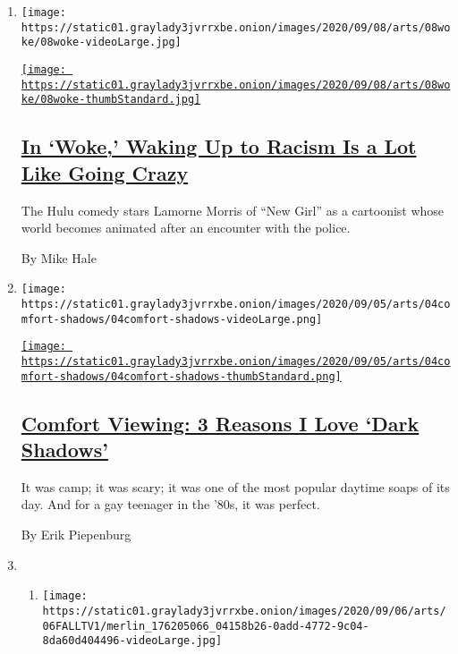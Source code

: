 \begin{enumerate}
\def\labelenumi{\arabic{enumi}.}
\item
  \texttt{[image: https://static01.graylady3jvrrxbe.onion/images/2020/09/08/arts/08woke/08woke-videoLarge.jpg]}

  \href{/2020/09/08/arts/television/review-woke.html}{\texttt{[image: https://static01.graylady3jvrrxbe.onion/images/2020/09/08/arts/08woke/08woke-thumbStandard.jpg]}}

  \hypertarget{in-woke-waking-up-to-racism-is-a-lot-like-going-crazy}{%
  \subsection{\texorpdfstring{\href{/2020/09/08/arts/television/review-woke.html}{In
  `Woke,' Waking Up to Racism Is a Lot Like Going
  Crazy}}{In `Woke,' Waking Up to Racism Is a Lot Like Going Crazy}}\label{in-woke-waking-up-to-racism-is-a-lot-like-going-crazy}}

  The Hulu comedy stars Lamorne Morris of ``New Girl'' as a cartoonist
  whose world becomes animated after an encounter with the police.

  By Mike Hale
\item
  \texttt{[image: https://static01.graylady3jvrrxbe.onion/images/2020/09/05/arts/04comfort-shadows/04comfort-shadows-videoLarge.png]}

  \href{/2020/09/04/arts/television/dark-shadows-stream.html}{\texttt{[image: https://static01.graylady3jvrrxbe.onion/images/2020/09/05/arts/04comfort-shadows/04comfort-shadows-thumbStandard.png]}}

  \hypertarget{comfort-viewing-3-reasons-i-love-dark-shadows}{%
  \subsection{\texorpdfstring{\href{/2020/09/04/arts/television/dark-shadows-stream.html}{Comfort
  Viewing: 3 Reasons I Love `Dark
  Shadows'}}{Comfort Viewing: 3 Reasons I Love `Dark Shadows'}}\label{comfort-viewing-3-reasons-i-love-dark-shadows}}

  It was camp; it was scary; it was one of the most popular daytime
  soaps of its day. And for a gay teenager in the '80s, it was perfect.

  By Erik Piepenburg
\item
  \begin{enumerate}
  \def\labelenumii{\arabic{enumii}.}
  \item
    \texttt{[image: https://static01.graylady3jvrrxbe.onion/images/2020/09/06/arts/06FALLTV1/merlin\_176205066\_04158b26-0add-4772-9c04-8da60d404496-videoLarge.jpg]}


\end{enumerate}
\end{enumerate}

